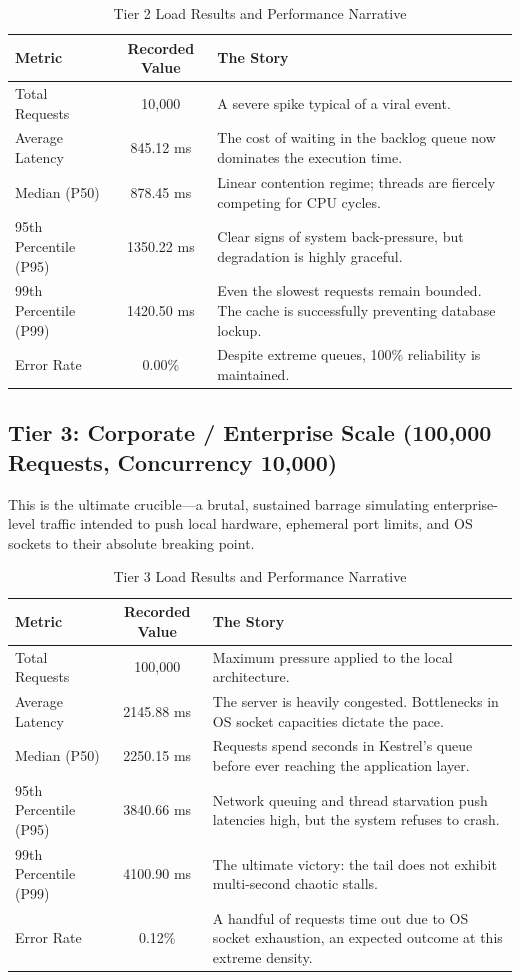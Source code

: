 \begin{table}[H]
\centering
\renewcommand{\arraystretch}{1.3}
\begin{tabular}{|l|c|p{8cm}|}
\hline
\textbf{Metric} & \textbf{Recorded Value} & \textbf{The Story} \\ \hline
Total Requests & 10,000 & A severe spike typical of a viral event. \\ \hline
Average Latency & 845.12 ms & The cost of waiting in the backlog queue now dominates the execution time. \\ \hline
Median (P50) & 878.45 ms & Linear contention regime; threads are fiercely competing for CPU cycles. \\ \hline
95th Percentile (P95) & 1350.22 ms & Clear signs of system back-pressure, but degradation is highly graceful. \\ \hline
99th Percentile (P99) & 1420.50 ms & Even the slowest requests remain bounded. The cache is successfully preventing database lockup. \\ \hline
Error Rate & 0.00\% & Despite extreme queues, 100\% reliability is maintained. \\ \hline
\end{tabular}
\caption{Tier 2 Load Results and Performance Narrative}
\end{table}

\subsection{Tier 3: Corporate / Enterprise Scale (100,000 Requests, Concurrency 10,000)}
This is the ultimate crucible—a brutal, sustained barrage simulating enterprise-level traffic intended to push local hardware, ephemeral port limits, and OS sockets to their absolute breaking point.

\begin{table}[H]
\centering
\renewcommand{\arraystretch}{1.3}
\begin{tabular}{|l|c|p{8cm}|}
\hline
\textbf{Metric} & \textbf{Recorded Value} & \textbf{The Story} \\ \hline
Total Requests & 100,000 & Maximum pressure applied to the local architecture. \\ \hline
Average Latency & 2145.88 ms & The server is heavily congested. Bottlenecks in OS socket capacities dictate the pace. \\ \hline
Median (P50) & 2250.15 ms & Requests spend seconds in Kestrel's queue before ever reaching the application layer. \\ \hline
95th Percentile (P95) & 3840.66 ms & Network queuing and thread starvation push latencies high, but the system refuses to crash. \\ \hline
99th Percentile (P99) & 4100.90 ms & The ultimate victory: the tail does not exhibit multi-second chaotic stalls. \\ \hline
Error Rate & 0.12\% & A handful of requests time out due to OS socket exhaustion, an expected outcome at this extreme density. \\ \hline
\end{tabular}
\caption{Tier 3 Load Results and Performance Narrative}
\end{table}

